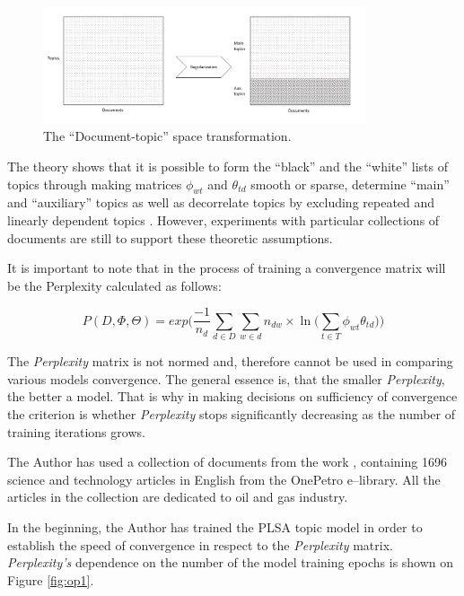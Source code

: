 \documentclass[12pt]{report}
\theoremstyle{definition}
\begin{document}
\begin{figure}
	\centering
	\includegraphics[width=0.85\textwidth]{op3fig4eng.png}
	\caption{The ``Document-topic'' space transformation.}
	\label{fig:op4}
\end{figure}


The theory shows that it is possible to form the ``black'' and the ``white'' lists of topics through making matrices $\phi_{wt}$ and $\theta_{td}$ \cite{vorontsov2015bigartm} smooth or sparse, determine ``main'' and ``auxiliary'' topics \cite{vorontsov2015non} as well as decorrelate topics by excluding repeated and linearly dependent topics \cite{vorontsov2014tutorial}. 
However, experiments with particular collections of documents are still to support these theoretic assumptions.

It is important to note that in the process of training a convergence matrix will be the Perplexity calculated as follows:

\begin{equation} 
\label{eq:op4}
P \left(D,\Phi, \Theta \right) = exp \bigg( \frac{-1}{n_d} \sum_{d \in D} \sum_{w \in d} n_{dw} \times \ln \bigg( \sum_{t \in T} \phi_{wt} \theta_{td} \bigg) \bigg)
\end{equation}

The \textit{Perplexity} matrix is not normed and, therefore cannot be used in comparing various models convergence. The general essence is, that the smaller \textit{Perplexity}, the better a model. 
That is why in making decisions on sufficiency of convergence the criterion is whether \textit{Perplexity} stops significantly decreasing as the number of training iterations grows.

The Author has used a collection of documents from the work \cite{krasnov2018bi}, containing 1696 science and technology articles in English from the OnePetro e--library. 
All the articles in the collection are dedicated to oil and gas industry.

In the beginning, the Author has trained the PLSA topic model in order to establish the speed of convergence in respect to the \textit{Perplexity} matrix. \textit{Perplexity's} dependence on the number of the model training epochs is shown on Figure \ref{fig:op1}.
\end{document}
